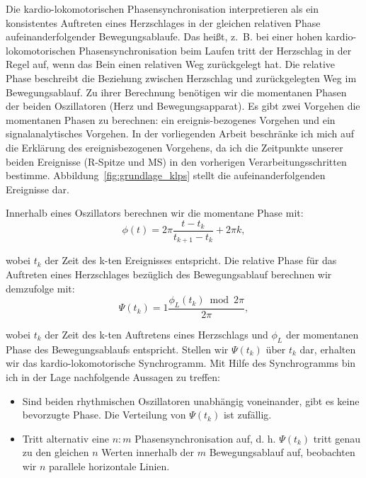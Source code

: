 Die kardio-lokomotorischen Phasensynchronisation interpretieren \citet[][S.~12]{Niizeki2014} als ein konsistentes Auftreten eines Herzschlages in der gleichen relativen Phase aufeinanderfolgender Bewegungsablaufe. Das heißt, z.~B. bei einer hohen kardio-lokomotorischen Phasensynchronisation beim Laufen tritt der Herzschlag in der Regel auf, wenn das Bein einen relativen Weg zurückgelegt hat. Die relative Phase beschreibt die Beziehung zwischen Herzschlag und zurückgelegten Weg im Bewegungsablauf. Zu ihrer Berechnung benötigen wir die momentanen Phasen der beiden Oszillatoren (Herz und Bewegungsapparat). Es gibt zwei Vorgehen die momentanen Phasen zu berechnen: ein ereignis-bezogenes Vorgehen und ein signalanalytisches Vorgehen. In der vorliegenden Arbeit beschränke ich mich auf die Erklärung des ereignisbezogenen Vorgehens, da ich die Zeitpunkte unserer beiden Ereignisse (R-Spitze und \ac{MS}) in den vorherigen Verarbeitungsschritten bestimme. Abbildung~\ref{fig:grundlage_klps} stellt die aufeinanderfolgenden Ereignisse dar.

Innerhalb eines Oszillators berechnen wir die momentane Phase mit: 
\begin{equation}
	\phi(t) = 2 \pi \frac{t-t_{k}}{t_{k+1}-t_{k}} + 2 \pi k, 
\end{equation}

wobei $t_{k}$ der Zeit des k-ten Ereignisses entspricht. Die relative Phase für das Auftreten eines Herzschlages bezüglich des Bewegungsablauf berechnen wir demzufolge mit: 
\begin{equation}
	\Psi(t_{k}) = 1 \frac{\phi_{L}(t_{k}) \bmod 2 \pi}{2 \pi}, 
\end{equation}

wobei $t_{k}$ der Zeit des k-ten Auftretens eines Herzschlags und $\phi_{L}$ der momentanen Phase des Bewegungsablaufs entspricht. Stellen wir $\Psi(t_{k})$ über $t_{k}$ dar, erhalten wir das kardio-lokomotorische Synchrogramm. Mit Hilfe des Synchrogramms bin ich in der Lage nachfolgende Aussagen zu treffen: 
\begin{itemize}
	
	\item Sind beiden rhythmischen Oszillatoren unabhängig voneinander, gibt es keine bevorzugte Phase. Die Verteilung von $\Psi(t_{k})$ ist zufällig.
	
	\item Tritt alternativ eine $n:m$ Phasensynchronisation auf, d. h. $\Psi(t_{k})$ tritt genau zu den gleichen $n$ Werten innerhalb der $m$ Bewegungsablauf auf, beobachten wir $n$ parallele horizontale Linien. 
\end{itemize}

